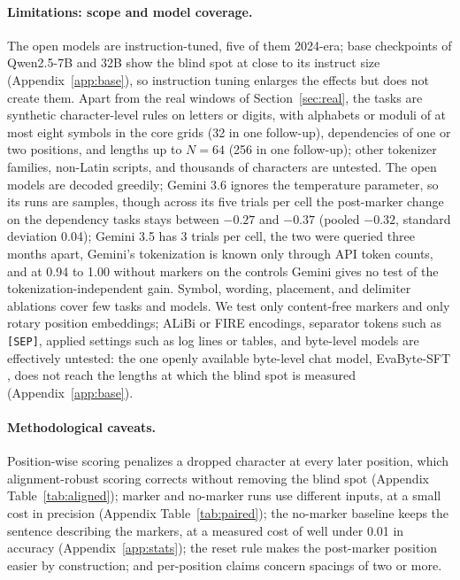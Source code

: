 \documentclass[10pt]{article} %
\begin{document}
\paragraph{Limitations: scope and model coverage.} The open models are instruction-tuned, five of them 2024-era; base checkpoints of Qwen2.5-7B and 32B show the blind spot at close to its instruct size (Appendix~\ref{app:base}), so instruction tuning enlarges the effects but does not create them. Apart from the real windows of Section~\ref{sec:real}, the tasks are synthetic character-level rules on letters or digits, with alphabets or moduli of at most eight symbols in the core grids (32 in one follow-up), dependencies of one or two positions, and lengths up to $N = 64$ (256 in one follow-up); other tokenizer families, non-Latin scripts, and thousands of characters are untested. The open models are decoded greedily; Gemini 3.6 ignores the temperature parameter, so its runs are samples, though across its five trials per cell the post-marker change on the dependency tasks stays between $-0.27$ and $-0.37$ (pooled $-0.32$, standard deviation 0.04); Gemini 3.5 has 3 trials per cell, the two were queried three months apart, Gemini's tokenization is known only through API token counts, and at 0.94 to 1.00 without markers on the controls Gemini gives no test of the tokenization-independent gain. Symbol, wording, placement, and delimiter ablations cover few tasks and models. We test only content-free markers and only rotary position embeddings; ALiBi or FIRE encodings, separator tokens such as \texttt{[SEP]}, applied settings such as log lines or tables, and byte-level models are effectively untested: the one openly available byte-level chat model, EvaByte-SFT \citep{zheng2025evabyte}, does not reach the lengths at which the blind spot is measured (Appendix~\ref{app:base}).

\paragraph{Methodological caveats.} Position-wise scoring penalizes a dropped character at every later position, which alignment-robust scoring corrects without removing the blind spot (Appendix Table~\ref{tab:aligned}); marker and no-marker runs use different inputs, at a small cost in precision (Appendix Table~\ref{tab:paired}); the no-marker baseline keeps the sentence describing the markers, at a measured cost of well under 0.01 in accuracy (Appendix~\ref{app:stats}); the reset rule makes the post-marker position easier by construction; and per-position claims concern spacings of two or more.
\end{document}
